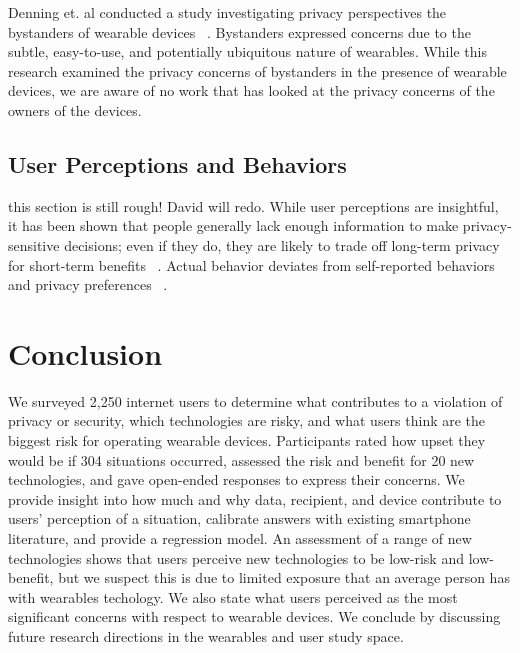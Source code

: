\documentclass{acm_proc_article-sp}
\begin{document}
Denning et. al conducted a study investigating privacy perspectives the bystanders of wearable devices ~\cite{Denning2014}. Bystanders expressed concerns due to the subtle, easy-to-use, and potentially ubiquitous nature of wearables. While this research examined the privacy concerns of bystanders in the presence of wearable devices, we are aware of no work that has looked at the privacy concerns of the owners of the devices.

\subsection{User Perceptions and Behaviors}
{\color{red} this section is still rough! David will redo.} 
While user perceptions are insightful, it has been shown that people generally lack enough information to make privacy-sensitive decisions; even if they do, they are likely to trade off long-term privacy for short-term benefits ~\cite{acquisti2005privacy}. Actual behavior deviates from self-reported behaviors ~\cite{jensen2005privacy} and privacy preferences ~\cite{spiekermann2001privacy}. 



\section{Conclusion}

We surveyed 2,250 internet users to determine what contributes to a violation of privacy or security, which technologies are risky, and what users think are the biggest risk for operating wearable devices. Participants rated how upset they would be if 304 situations occurred, assessed the risk and benefit for 20 new technologies, and gave open-ended responses to express their concerns. We provide insight into how much and why data, recipient, and device contribute to users' perception of a situation, calibrate answers with existing smartphone literature, and provide a regression model. An assessment of a range of new technologies shows that users perceive new technologies to be low-risk and low-benefit, but we suspect this is due to limited exposure that an average person has with wearables techology. We also state what users perceived as the most significant concerns with respect to wearable devices. We conclude by discussing future research directions in the wearables and user study space. 
\end{document}
